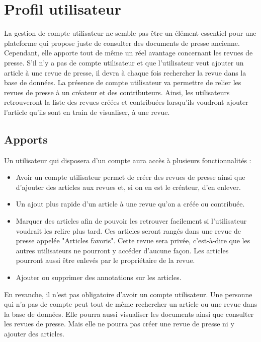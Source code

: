 \section{Profil utilisateur}
\label{sec:profil}

La gestion de compte utilisateur ne semble pas être un élément essentiel pour une plateforme qui propose juste de consulter des documents de presse ancienne. Cependant, elle apporte tout de même un réel avantage concernant les revues de presse.
S'il n'y a pas de compte utilisateur et que l'utilisateur veut ajouter un article à une revue de presse, il devra à chaque fois rechercher la revue dans la base de données.
La présence de compte utilisateur va permettre de relier les revues de presse à un créateur et des contributeurs. Ainsi, les utilisateurs retrouveront la liste des revues créées et contribuées lorsqu'ils voudront ajouter l'article qu'ils sont en train de visualiser, à une revue.


\subsection{Apports}
\label{apport}
 

Un utilisateur qui disposera d'un compte aura accès à plusieurs fonctionnalités :

\begin{itemize}
  \item Avoir un compte utilisateur permet de créer des revues de presse ainsi que d'ajouter des articles aux revues et, si on en est le créateur, d'en enlever.
  \item Un ajout plus rapide d'un article à une revue qu'on a créée ou contribuée.
  \item Marquer des articles afin de pouvoir les retrouver facilement si l'utilisateur voudrait les relire plus tard. Ces articles seront rangés dans une revue de presse appelée "Articles favoris". Cette revue sera privée, c'est-à-dire que les autres utilisateurs ne pourront y accéder d'aucune façon. Les articles pourront aussi être enlevés par le propriétaire de la revue.
	\item Ajouter ou supprimer des annotations sur les articles.
\end{itemize}

En revanche, il n'est pas obligatoire d'avoir un compte utilisateur. Une personne qui n'a pas de compte peut tout de même rechercher un article ou une revue dans la base de données. Elle pourra aussi visualiser les documents ainsi que consulter les revues de presse. Mais elle ne pourra pas créer une revue de presse ni y ajouter des articles.



